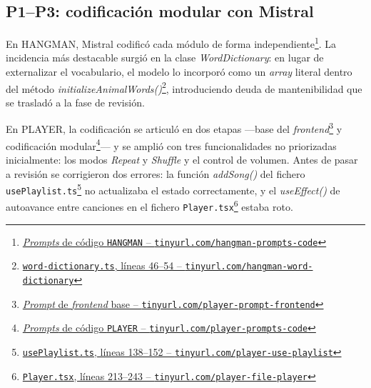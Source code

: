\subsection{P1--P3: codificación modular con Mistral}

En \ac{HANGMAN}, Mistral codificó cada módulo de forma independiente\footnote{\href{https://github.com/alu0101549491/TFG-Fabian-Gonzalez-Lence/tree/main/resources/prompts/1-TheHangmanGame/3-CodigoPorModulo}{\textit{Prompts} de código \texttt{HANGMAN} -- \texttt{tinyurl.com/hangman-prompts-code}}}. La incidencia más destacable surgió en la clase \textit{WordDictionary}: en lugar de externalizar el vocabulario, el modelo lo incorporó como un \textit{array} literal dentro del método \textit{initializeAnimalWords()}\footnote{\href{https://github.com/alu0101549491/TFG-Fabian-Gonzalez-Lence/blob/6ade2d937c5fc8507893551a8f82d8d46e6fcbb2/projects/1-TheHangmanGame/src/models/word-dictionary.ts\#L46-L54}{\texttt{word-dictionary.ts}, líneas 46--54 -- \texttt{tinyurl.com/hangman-word-dictionary}}}, introduciendo deuda de mantenibilidad que se trasladó a la fase de revisión.

En \ac{PLAYER}, la codificación se articuló en dos etapas ---base del \textit{frontend}\footnote{\href{https://github.com/alu0101549491/TFG-Fabian-Gonzalez-Lence/blob/main/resources/prompts/2-MusicWebPlayer/2-CodigoFrontend/frontend.prompt.md}{\textit{Prompt} de \textit{frontend} base -- \texttt{tinyurl.com/player-prompt-frontend}}} y codificación modular\footnote{\href{https://github.com/alu0101549491/TFG-Fabian-Gonzalez-Lence/tree/main/resources/prompts/2-MusicWebPlayer/3-CodigoPorModulo}{\textit{Prompts} de código \texttt{PLAYER} -- \texttt{tinyurl.com/player-prompts-code}}}--- y se amplió con tres funcionalidades no priorizadas inicialmente: los modos \textit{Repeat} y \textit{Shuffle} y el control de volumen. Antes de pasar a revisión se corrigieron dos errores: la función \textit{addSong()} del fichero \texttt{usePlaylist.ts}\footnote{\href{https://github.com/alu0101549491/TFG-Fabian-Gonzalez-Lence/blob/main/projects/2-MusicWebPlayer/src/hooks/usePlaylist.ts\#L138-L152}{\texttt{usePlaylist.ts}, líneas 138--152 -- \texttt{tinyurl.com/player-use-playlist}}} no actualizaba el estado correctamente, y el \textit{useEffect()} de autoavance entre canciones en el fichero \texttt{Player.tsx}\footnote{\href{https://github.com/alu0101549491/TFG-Fabian-Gonzalez-Lence/blob/main/projects/2-MusicWebPlayer/src/components/Player.tsx\#L213-L243}{\texttt{Player.tsx}, líneas 213--243 -- \texttt{tinyurl.com/player-file-player}}} estaba roto.

